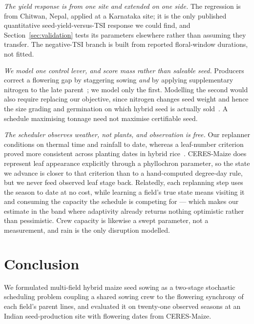 \documentclass[10pt,twocolumn]{article}
\begin{document}
\emph{The yield response is from one site and extended on one side.} The
regression is from Chitwan, Nepal, applied at a Karnataka site; it is the
only published quantitative seed-yield-versus-TSI response we could find, and
Section~\ref{sec:validation} tests its parameters elsewhere rather than
assuming they transfer. The negative-TSI branch is built from reported
floral-window durations, not fitted.

\emph{We model one control lever, and score mass rather than saleable seed.}
Producers correct a flowering gap by staggering sowing \emph{and} by applying
supplementary nitrogen to the late parent~\cite{priyanka2017,patil2026,%
asefa2024}; we model only the first. Modelling the second would also require
replacing our objective, since nitrogen changes seed weight and hence the
size grading and germination on which hybrid seed is actually
sold~\cite{marahatta2025}. A schedule maximising tonnage need not maximise
certifiable seed.

\emph{The scheduler observes weather, not plants, and observation is free.}
Our replanner conditions on thermal time and rainfall to date, whereas a
leaf-number criterion proved more consistent across planting dates in hybrid
rice~\cite{varma2018}. CERES-Maize does represent leaf appearance explicitly
through a phyllochron parameter, so the state we advance is closer to that
criterion than to a hand-computed degree-day rule, but we never feed observed
leaf stage back. Relatedly, each replanning step uses the season to date at
no cost, while learning a field's true state means visiting it and consuming
the capacity the schedule is competing for --- which makes our estimate in
the band where adaptivity already returns nothing optimistic rather than
pessimistic. Crew capacity is likewise a swept parameter, not a measurement,
and rain is the only disruption modelled.

\section{Conclusion}

We formulated multi-field hybrid maize seed sowing as a two-stage
stochastic scheduling problem coupling a shared sowing crew to the
flowering synchrony of each field's parent lines, and evaluated it on
twenty-one observed seasons at an Indian seed-production site with
flowering dates from CERES-Maize.
\end{document}
